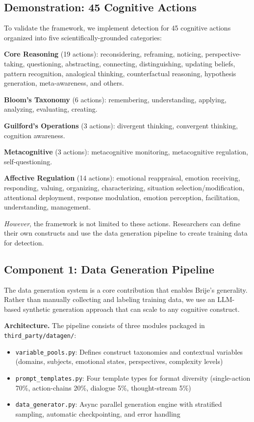 \documentclass[letterpaper]{article}
\begin{document}
\subsection{Demonstration: 45 Cognitive Actions}

To validate the framework, we implement detection for 45 cognitive actions organized into five scientifically-grounded categories:

\textbf{Core Reasoning} (19 actions): reconsidering, reframing, noticing, perspective-taking, questioning, abstracting, connecting, distinguishing, updating beliefs, pattern recognition, analogical thinking, counterfactual reasoning, hypothesis generation, meta-awareness, and others.

\textbf{Bloom's Taxonomy} (6 actions): remembering, understanding, applying, analyzing, evaluating, creating.

\textbf{Guilford's Operations} (3 actions): divergent thinking, convergent thinking, cognition awareness.

\textbf{Metacognitive} (3 actions): metacognitive monitoring, metacognitive regulation, self-questioning.

\textbf{Affective Regulation} (14 actions): emotional reappraisal, emotion receiving, responding, valuing, organizing, characterizing, situation selection/modification, attentional deployment, response modulation, emotion perception, facilitation, understanding, management.

\emph{However}, the framework is not limited to these actions. Researchers can define their own constructs and use the data generation pipeline to create training data for detection.

\subsection{Component 1: Data Generation Pipeline}

The data generation system is a core contribution that enables Brije's generality. Rather than manually collecting and labeling training data, we use an LLM-based synthetic generation approach that can scale to any cognitive construct.

\textbf{Architecture.} The pipeline consists of three modules packaged in \texttt{third\_party/datagen/}:

\begin{itemize}
\item \texttt{variable\_pools.py}: Defines construct taxonomies and contextual variables (domains, subjects, emotional states, perspectives, complexity levels)
\item \texttt{prompt\_templates.py}: Four template types for format diversity (single-action 70\%, action-chains 20\%, dialogue 5\%, thought-stream 5\%)
\item \texttt{data\_generator.py}: Async parallel generation engine with stratified sampling, automatic checkpointing, and error handling
\end{itemize}
\end{document}

